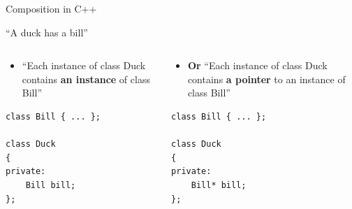 \begin{frame}[fragile]{Composition in C++}
    \begin{center}
        ``A duck has a bill''
    \end{center}
    \pause
    \begin{columns}
        \begin{column}{0.48\textwidth}
            \begin{itemize}
                \item ``Each instance of class Duck contains \textbf{an instance} of class Bill''
            \end{itemize}
            \begin{lstlisting}
class Bill { ... };

class Duck
{
private:
    Bill bill;
};
            \end{lstlisting}
        \end{column}
        \pause
        \begin{column}{0.48\textwidth}
            \begin{itemize}
                \item \textbf{Or} ``Each instance of class Duck contains \textbf{a pointer} to an instance of class Bill''
            \end{itemize}
            \begin{lstlisting}
class Bill { ... };

class Duck
{
private:
    Bill* bill;
};
            \end{lstlisting}
        \end{column}
    \end{columns}
\end{frame}

